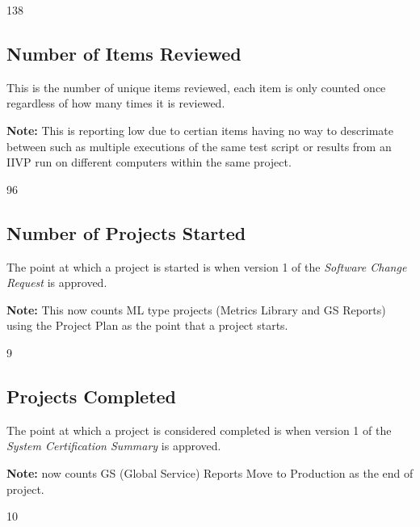 \documentclass{article}
\begin{document}
\begin{Schunk}
\begin{Soutput}
[1] 138
\end{Soutput}
\end{Schunk}

\subsection{Number of Items Reviewed}
This is the number of unique items reviewed, each item is only counted once
regardless of how many times it is reviewed.

\textbf{Note:} This is reporting low due to certian items having no way to
descrimate between such as multiple executions of the same test script or
results from an IIVP run on different computers within the same project.

\begin{Schunk}
\begin{Soutput}
[1] 96
\end{Soutput}
\end{Schunk}

\subsection{Number of Projects Started}
The point at which a project is started is when version 1 of the \textit{Software
Change Request} is approved.

\textbf{Note:} This now counts ML type projects (Metrics Library and GS Reports)
using the Project Plan as the point that a project starts.

\begin{Schunk}
\begin{Soutput}
[1] 9
\end{Soutput}
\end{Schunk}

\subsection{Projects Completed}

The point at which a project is considered completed is when version 1 of the
\textit{System Certification Summary} is approved.

\textbf{Note:} now counts GS (Global Service) Reports Move to Production as the end
of project.

\begin{Schunk}
\begin{Soutput}
[1] 10
\end{Soutput}
\end{Schunk}
\end{document}
